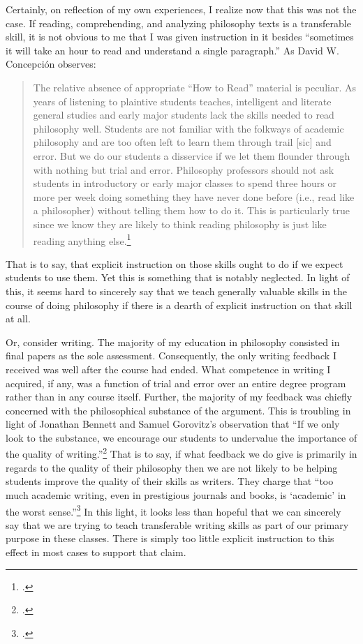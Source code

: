 \documentclass[letterpaper,notitlepage,12pt]{article}
\begin{document}
Certainly, on reflection of my own experiences, I realize now that this was not
the case.
If reading, comprehending, and analyzing philosophy texts is a transferable
skill, it is not obvious to me that I was given instruction in it besides
``sometimes it will take an hour to read and understand a single paragraph.''
As David W. Concepci\'on observes:
\begin{quotation}
The relative absence of appropriate ``How to Read'' material is peculiar. 
As years of listening to plaintive students teaches, intelligent and literate 
general studies and early major students lack the skills needed to read 
philosophy well.
Students are not familiar with the folkways of academic philosophy and are too
often left to learn them through trail [sic] and error. 
But we do our students a disservice if we let them flounder through with 
nothing but trial and error.
Philosophy professors should not ask students in introductory or early major
classes to spend three hours or more per week doing something they have never
done before (i.e., read like a philosopher) without telling them how to do it.
This is particularly true since we know they are likely to think reading
philosophy is just like reading anything
else.\footcite[p.351-2]{concepcion_reading_2004} 
\end{quotation}
That is to say, that explicit instruction on those skills ought to do  if we
expect students to use them.
Yet this is something that is notably neglected.
In light of this, it seems hard to sincerely say that we teach generally 
valuable skills in the course of doing philosophy if there is a dearth of
explicit instruction on that skill at all.

Or, consider writing.
The majority of my education in philosophy consisted in final papers as the sole
assessment.
Consequently, the only writing feedback I received was well after the course had
ended.
What competence in writing I acquired, if any, was a function of trial and error
over an entire degree program rather than in any course itself.
Further, the majority of my feedback was chiefly concerned with the
philosophical substance of the argument.
This is troubling in light of Jonathan Bennett and Samuel Gorovitz's observation
that ``If we only look to the substance, we encourage our students to undervalue
the importance of the quality of writing.''\footcite[p.
10]{bennett_improving_1997}
That is to say, if what feedback we do give is primarily in regards to the
quality of their philosophy then we are not likely to be helping students
improve the quality of their skills as writers.
They charge that ``too much academic writing, even in prestigious
journals and books, is `academic' in the worst sense.''\footcite[p.
10]{bennett_improving_1997}
In this light, it looks less than hopeful that we can sincerely say that we are
trying to teach transferable writing skills as part of our primary purpose in
these classes.
There is simply too little explicit instruction to this effect in most cases to
support that claim.
\end{document}

